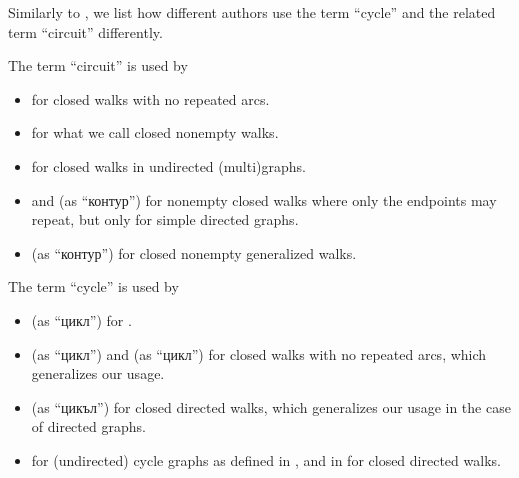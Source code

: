 \begin{remark}\label{rem:graph_cycle_terminology}
  Similarly to , we list how different authors use the term \enquote{cycle} and the related term \enquote{circuit} differently.

  \begin{thmenum}
     The term \enquote{circuit} is used by
    \begin{itemize}
      \item {} for closed walks with no repeated arcs.

      \item {} for what we call closed nonempty walks.

      \item {} for closed walks in undirected (multi)graphs.

      \item {} and  (as \enquote{контур}) for nonempty closed walks where only the endpoints may repeat, but only for simple directed graphs.

      \item {} (as \enquote{контур}) for closed nonempty generalized walks.
    \end{itemize}

     The term \enquote{cycle} is used by
    \begin{itemize}
      \item {} (as \enquote{цикл}) for .

      \item {} (as \enquote{цикл}) and  (as \enquote{цикл}) for closed walks with no repeated arcs, which generalizes our usage.

      \item {} (as \enquote{цикъл}) for closed directed walks, which generalizes our usage in the case of directed graphs.

      \item {} for (undirected) cycle graphs as defined in , and in \cite[def. 10.4.2]{Rosen2019DiscreteMathematics} for closed directed walks.


\end{itemize}
\end{thmenum}
\end{remark}
